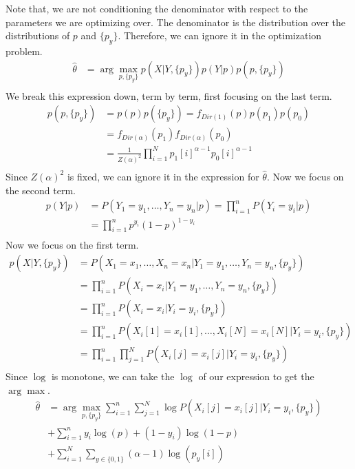 \documentclass{amsart}
\theoremstyle{definition}
\begin{document}
\begin{enumerate}[(a)]
		Note that, we are not conditioning the denominator with respect to the parameters we are optimizing over.
		The denominator is the distribution over the distributions of $p$ and $\{p_y\}$.
		Therefore, we can ignore it in the optimization problem.
		\begin{align*}
			\hat{\theta} &= \arg\max_{p, \{p_y\}} p(X|Y, \{p_y\})p(Y|p)p(p, \{p_y\})\\
		\end{align*}
		We break this expression down, term by term, first focusing on the last term.
		\begin{align*}
			p(p, \{p_y\}) &= p(p)p(\{p_y\}) = f_{Dir(1)}(p) p(p_1)p(p_0)\\
			&= f_{Dir(\alpha)}(p_1)f_{Dir(\alpha)}(p_0)\\
			&= \frac{1}{Z(\alpha)^2} \prod_{i=1}^{N} p_1[i]^{\alpha - 1}p_0[i]^{\alpha - 1}\\
		\end{align*}
		Since $Z(\alpha)^2$ is fixed, we can ignore it in the expression for $\hat{\theta}$.
		Now we focus on the second term.
		\begin{align*}
			p(Y|p) &= P(Y_1 = y_1, \ldots, Y_n = y_n|p) = \prod_{i=1}^{n} P(Y_i = y_i|p)\\
			&= \prod_{i=1}^{n } p^{y_i}(1-p)^{1-y_i}\\
		\end{align*}
		Now we focus on the first term.
		\begin{align*}
			p(X|Y, \{p_y\}) &= P(X_1 = x_1, \ldots, X_n = x_n|Y_1 = y_1, \ldots, Y_n = y_n, \{p_y\})\\
			&= \prod_{i=1}^{n} P(X_i = x_i|Y_1 = y_1, \ldots, Y_n = y_n, \{p_y\})\\
			&= \prod_{i=1}^{n} P(X_i = x_i|Y_i = y_i, \{p_y\})\\
			&= \prod_{i=1}^{n} P(X_i[1] = x_i[1], \ldots, X_i[N] = x_i[N]|Y_i = y_i, \{p_y\})\\
			&= \prod_{i=1}^{n} \prod_{j=1}^{N} P(X_i[j] = x_i[j]|Y_i = y_i, \{p_y\})\\
		\end{align*}
		Since $\log$ is monotone, we can take the $\log$ of our expression to get the $\arg\max$.
		\begin{align*}
			\hat{\theta}&=\arg\max_{p, \{p_y\}} \sum_{i=1}^{n}\sum_{j=1}^{N} \log P(X_i[j] = x_i[j]|Y_i = y_i, \{p_y\}) \\
			&+ \sum_{i=1}^{n} y_i\log(p) + (1-y_i)\log(1-p) \\
			&+ \sum_{i=1}^{N}\sum_{y \in \{0,1\}}(\alpha - 1)\log(p_y[i])\\

\end{align*}
\end{enumerate}
\end{document}
